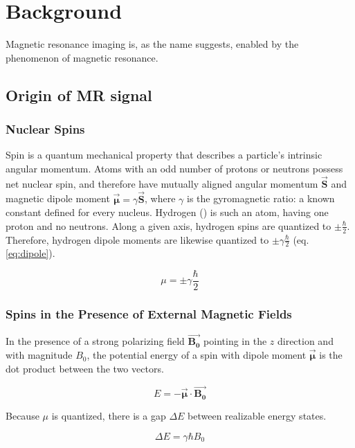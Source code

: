 \newcommand{\uvec}[1]{\bm{\hat{#1}}}
\newcommand{\bvec}[1]{\bm{\vec{#1}}}

\chapter{Background}
Magnetic resonance imaging is, as the name suggests, enabled by the phenomenon of magnetic resonance.

\section{Origin of MR signal}

\subsection{Nuclear Spins}
Spin is a quantum mechanical property that describes a particle's intrinsic angular momentum. Atoms with an odd
number of protons or neutrons possess net nuclear spin, and therefore have mutually aligned angular momentum $\bvec{S}$
and magnetic dipole moment $\bvec{\mu}= \gamma \bvec{S}$, where $\gamma$ is the gyromagnetic ratio: a known constant
defined for every nucleus. Hydrogen () is such an atom, having one proton and no neutrons. Along a given
axis, hydrogen spins are quantized to $\pm \frac{\hbar}2$.  Therefore, hydrogen dipole moments are likewise quantized to
$\pm \gamma \frac{\hbar}{2}$ (eq. \ref{eq:dipole}).

\begin{equation}\label{eq:dipole}
    \mu = \pm \gamma \frac{\hbar}{2}
\end{equation}

\subsection{Spins in the Presence of External Magnetic Fields}
In the presence of a strong polarizing field $\bvec{B_0}$ pointing in the $z$ direction and with magnitude $B_0$, the
potential energy of a spin with dipole moment $\bvec{\mu}$ is the dot product between the two vectors.

\begin{equation}\label{eq:spin_energy}
    E = - \bvec{\mu} \cdot \bvec{B_0}
\end{equation}

Because $\mu$ is quantized, there is a gap $\Delta E$ between realizable energy states.

\begin{equation}\label{eq:delta_E}
    \Delta E = \gamma \hbar B_0
\end{equation}


